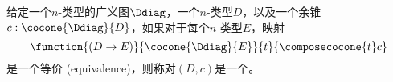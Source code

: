 \begin{defn}
    给定一个$n$-类型的广义图$\Ddiag$，一个$n$-类型$D$，以及一个余锥
    $c:\cocone{\Ddiag}{D}$，如果对于每个$n$-类型$E$，映射
    \[\function{(D\to{}E)}{\cocone{\Ddiag}{E}}{t}{\composecocone{t}c}\]
    是一个等价 (equivalence)，则称对$(D,c)$是一个。
\end{defn}

\begin{comment}
    我们在\cref{thm:pushout-ump}中展示了当$\P$是类型 (type) 时，推挤的存在性，通过使用高阶归纳类型 (higher inductive types) 进行了直接构造。
    对于一般的$\P$，推挤可能存在也可能不存在，但如果存在，它们是唯一的。

    \begin{lem}
        如果$(D,c)$ 和 $(D',c')$ 是$\P$中的两个推挤 (pushouts) ，那么$(D,c)=(D',c')$。
    \end{lem}
    \begin{proof}
        我们首先证明这两种类型$D$和$D'$是等价的。

        使用$D'$的泛性质 (universal property) 作用于$D$，我们可以看到以下映射是等价的
        \[
            \function{(D\to{}D')}{\cocone{\Ddiag}{D'}}{t}{\composecocone{t}c}
        \]
        特别地，存在一个映射$f:D\to{}D'$使得$\composecocone{f}c=c'$。同样地，存在一个映射$g:D'\to{}D$使得$\composecocone{g}c'=c$。

        为了证明$g\circ{}f=\idfunc[D]$，我们使用$D$的泛性质 (universal property) 作用于$D$，它表明以下映射是等价的：
        \[
            \function{(D\to{}D)}{\cocone{\Ddiag}{D}}{t}{\composecocone{t}c}
        \]
        使用函子性 (functoriality) $t\mapsto{}\composecocone{t}c$我们看到
        \begin{align*}
            \composecocone{(g\circ{}f)}c &= \composecocone{g}(\composecocone{f}c) \\
            &= \composecocone{g}c' \\
            &= c \\
            &= \composecocone{\idfunc[D]}c
        \end{align*}
        因此$g\circ{}f=\idfunc[D]$，因为等价映射是单射 (injective) 的。同样的论证
        对$D'$也适用，证明$f\circ{}g=\idfunc[D']$。

        因此$D$和$D'$是相等的，并且$(D,c)=(D',c')$这一事实源于我们定义的$D$和$D'$之间的等价映射将$c$映射到$c'$。
    \end{proof}

    \begin{cor}
        $\P$中的推挤类型 (type of pushouts) 是一个纯命题 (mere proposition)。特别地，如果
        推挤 (pushouts) 仅仅存在，那么它们实际上存在。
    \end{cor}

    就像在纤维积 (pullbacks) 的情况下，如果$\P$是反射子范畴 (reflective subcategory)，则$\P$中的推挤总是存在。然而，与纤维积 (pullbacks) 不同，$\P$中的推挤不是类型 (type) 中的推挤：它们是通过应用反射子范畴 (reflector) 获得的。
\end{comment}

